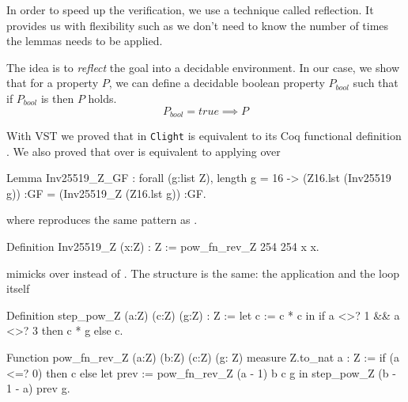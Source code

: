 In order to speed up the verification, we use a technique called reflection.
It provides us with flexibility such as we don't need to know the  number of
times the lemmas needs to be applied.

The idea is to \textit{reflect} the goal into a decidable environment.
In our case, we show that for a property $P$, we can define a decidable
boolean property $P_{bool}$ such that if $P_{bool}$ is  then $P$ holds.
$$P_{bool} = true \implies P$$

With VST we proved that  in \texttt{Clight} is equivalent to its Coq
functional definition . We also proved that 
over  is equivalent to applying
 over 


\begin{Coq}
Lemma Inv25519_Z_GF :
  forall (g:list Z),
  length g = 16 ->
  (Z16.lst (Inv25519 g)) :GF =
  (Inv25519_Z (Z16.lst g)) :GF.
\end{Coq}


where  reproduces the same pattern as .

\begin{Coq}
Definition Inv25519_Z (x:Z) : Z :=
  pow_fn_rev_Z 254 254 x x.
\end{Coq}

 mimicks  over  instead of
. The structure is the same:
the application  and the loop itself 

\begin{Coq}
Definition step_pow_Z (a:Z) (c:Z) (g:Z) : Z :=
  let c := c * c in
  if a <>? 1 && a <>? 3
    then c * g
    else c.

Function pow_fn_rev_Z (a:Z) (b:Z) (c:Z) (g: Z)
  {measure Z.to_nat a} : Z :=
  if (a <=? 0)
    then c
    else
      let prev := pow_fn_rev_Z (a - 1) b c g in
        step_pow_Z (b - 1 - a) prev g.
\end{Coq}
%

